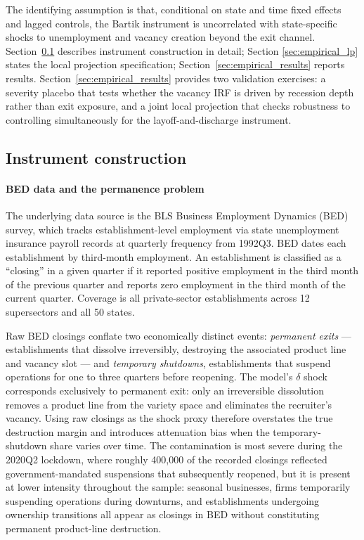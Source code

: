 \documentclass[authoryear, review, 12pt]{elsarticle}
\begin{document}
	The identifying assumption is that, conditional on state and time fixed
	effects and lagged controls, the Bartik instrument is uncorrelated with
	state-specific shocks to unemployment and vacancy creation beyond the
	exit channel. Section~\ref{sec:empirical_instr}
	describes instrument construction in detail;
	Section \ref{sec:empirical_lp} states the local projection
	specification; Section~\ref{sec:empirical_results} reports results. Section~\ref{sec:empirical_results} provides two
	validation exercises: a severity placebo that tests whether the vacancy
	IRF is driven by recession depth rather than exit exposure, and a joint
	local projection that checks robustness to controlling simultaneously
	for the layoff-and-discharge instrument.  

	\subsection{Instrument construction}\label{sec:empirical_instr}

	\paragraph{BED data and the permanence problem}
	The underlying data source is the BLS Business Employment Dynamics
	(BED) survey, which tracks establishment-level employment via state
	unemployment insurance payroll records at quarterly frequency from
	1992Q3.  BED dates each establishment by third-month employment.  An
	establishment is classified as a ``closing'' in a given quarter if it
	reported positive employment in the third month of the previous
	quarter and reports zero employment in the third month of the current
	quarter.  Coverage is all private-sector establishments across
	12 supersectors and all 50 states.

	Raw BED closings conflate two economically distinct events:
	\emph{permanent exits} --- establishments that dissolve irreversibly,
	destroying the associated product line and vacancy slot --- and
	\emph{temporary shutdowns}, establishments that suspend operations for
	one to three quarters before reopening.  The model's $\delta$ shock
	corresponds exclusively to permanent exit: only an irreversible
	dissolution removes a product line from the variety space and
	eliminates the recruiter's vacancy.  Using raw closings as the shock
	proxy therefore overstates the true destruction margin and introduces
	attenuation bias when the temporary-shutdown share varies over time.
	The contamination is most severe during the 2020Q2 lockdown, where
	roughly 400,000 of the recorded closings reflected government-mandated
	suspensions that subsequently reopened, but it is present at lower
	intensity throughout the sample: seasonal businesses, firms temporarily
	suspending operations during downturns, and establishments undergoing
	ownership transitions all appear as closings in BED without
	constituting permanent product-line destruction.
\end{document}
